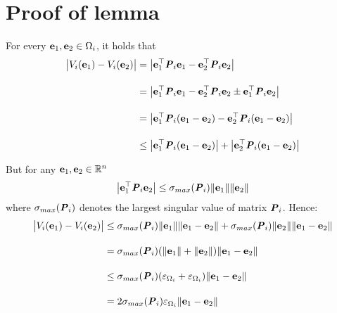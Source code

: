 \section{Proof of lemma }

For every $\bm{\mathbf{e}}_1, \bm{\mathbf{e}}_2 \in \Omega_i$, it holds that
\begin{align}
  \big|V_i(\bm{\mathbf{e}}_1) - V_i(\bm{\mathbf{e}}_2)\big| &= \big|\bm{\mathbf{e}}_1^{\top} \bm{\mathit{P}}_i \bm{\mathbf{e}}_1 - \bm{\mathbf{e}}_2^{\top} \bm{\mathit{P}}_i \bm{\mathbf{e}}_2\big| \\[2.5ex]
    &= \big|\bm{\mathbf{e}}_1^{\top} \bm{\mathit{P}}_i \bm{\mathbf{e}}_1 - \bm{\mathbf{e}}_2^{\top} \bm{\mathit{P}}_i \bm{\mathbf{e}}_2 \pm \bm{\mathbf{e}}_1^{\top} \bm{\mathit{P}}_i \bm{\mathbf{e}}_2\big| \\[2.5ex]
    &= \big|\bm{\mathbf{e}}_1^{\top} \bm{\mathit{P}}_i (\bm{\mathbf{e}}_1 -\bm{\mathbf{e}}_2) - \bm{\mathbf{e}}_2^{\top} \bm{\mathit{P}}_i (\bm{\mathbf{e}}_1-\bm{\mathbf{e}}_2)\big| \\[2.5ex]
    &\leq \big|\bm{\mathbf{e}}_1^{\top} \bm{\mathit{P}}_i (\bm{\mathbf{e}}_1 -\bm{\mathbf{e}}_2)\big| + \big|\bm{\mathbf{e}}_2^{\top} \bm{\mathit{P}}_i (\bm{\mathbf{e}}_1-\bm{\mathbf{e}}_2)\big|
\end{align}

But for any $\bm{\mathbf{e}}_1, \bm{\mathbf{e}}_2 \in \mathbb{R}^n$
$$\big|\bm{\mathbf{e}}_1^{\top} \bm{\mathit{P}}_i \bm{\mathbf{e}}_2\big| \leq \sigma_{max}(\bm{\mathit{P}}_i) \|\bm{\mathbf{e}}_1\| \|\bm{\mathbf{e}}_2\|$$
where $\sigma_{max}(\bm{\mathit{P}}_i)$ denotes the largest singular value of matrix
$\bm{\mathit{P}}_i$. Hence:
\begin{align}
\big|V_i(\bm{\mathbf{e}}_1) - V_i(\bm{\mathbf{e}}_2)\big| &\leq
  \sigma_{max}(\bm{\mathit{P}}_i) \|\bm{\mathbf{e}}_1\| \|\bm{\mathbf{e}}_1 - \bm{\mathbf{e}}_2\| +
  \sigma_{max}(\bm{\mathit{P}}_i) \|\bm{\mathbf{e}}_2\| \|\bm{\mathbf{e}}_1 - \bm{\mathbf{e}}_2\| \\[2.5ex]
  &= \sigma_{max}(\bm{\mathit{P}}_i) (\|\bm{\mathbf{e}}_1\| + \|\bm{\mathbf{e}}_2\|)\|\bm{\mathbf{e}}_1 - \bm{\mathbf{e}}_2\| \\[2.5ex]
  & \leq \sigma_{max}(\bm{\mathit{P}}_i) (\varepsilon_{\Omega_i} + \varepsilon_{\Omega_i})\|\bm{\mathbf{e}}_1 - \bm{\mathbf{e}}_2\| \\[2.5ex]
  &= 2 \sigma_{max}(\bm{\mathit{P}}_i) \varepsilon_{\Omega_i} \|\bm{\mathbf{e}}_1 - \bm{\mathbf{e}}_2\|
\end{align}
